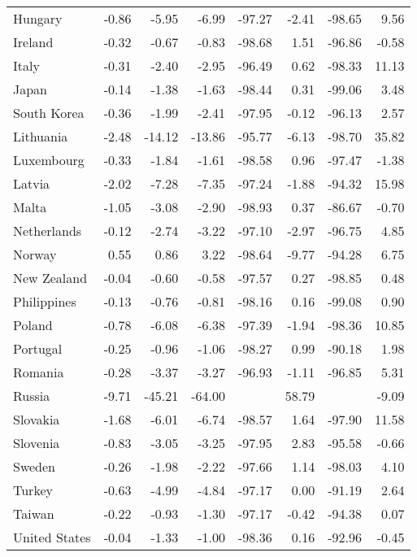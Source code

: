 \begin{longtable}{lrrrrrrr}
  Hungary & -0.86 & -5.95 & -6.99 & -97.27 & -2.41 & -98.65 & 9.56 \\ 
  Ireland & -0.32 & -0.67 & -0.83 & -98.68 & 1.51 & -96.86 & -0.58 \\ 
  Italy & -0.31 & -2.40 & -2.95 & -96.49 & 0.62 & -98.33 & 11.13 \\ 
  Japan & -0.14 & -1.38 & -1.63 & -98.44 & 0.31 & -99.06 & 3.48 \\ 
  South Korea & -0.36 & -1.99 & -2.41 & -97.95 & -0.12 & -96.13 & 2.57 \\ 
  Lithuania & -2.48 & -14.12 & -13.86 & -95.77 & -6.13 & -98.70 & 35.82 \\ 
  Luxembourg & -0.33 & -1.84 & -1.61 & -98.58 & 0.96 & -97.47 & -1.38 \\ 
  Latvia & -2.02 & -7.28 & -7.35 & -97.24 & -1.88 & -94.32 & 15.98 \\ 
  Malta & -1.05 & -3.08 & -2.90 & -98.93 & 0.37 & -86.67 & -0.70 \\ 
  Netherlands & -0.12 & -2.74 & -3.22 & -97.10 & -2.97 & -96.75 & 4.85 \\ 
  Norway & 0.55 & 0.86 & 3.22 & -98.64 & -9.77 & -94.28 & 6.75 \\ 
  New Zealand & -0.04 & -0.60 & -0.58 & -97.57 & 0.27 & -98.85 & 0.48 \\ 
  Philippines & -0.13 & -0.76 & -0.81 & -98.16 & 0.16 & -99.08 & 0.90 \\ 
  Poland & -0.78 & -6.08 & -6.38 & -97.39 & -1.94 & -98.36 & 10.85 \\ 
  Portugal & -0.25 & -0.96 & -1.06 & -98.27 & 0.99 & -90.18 & 1.98 \\ 
  Romania & -0.28 & -3.37 & -3.27 & -96.93 & -1.11 & -96.85 & 5.31 \\ 
  Russia & -9.71 & -45.21 & -64.00 &  & 58.79 &  & -9.09 \\ 
  Slovakia & -1.68 & -6.01 & -6.74 & -98.57 & 1.64 & -97.90 & 11.58 \\ 
  Slovenia & -0.83 & -3.05 & -3.25 & -97.95 & 2.83 & -95.58 & -0.66 \\ 
  Sweden & -0.26 & -1.98 & -2.22 & -97.66 & 1.14 & -98.03 & 4.10 \\ 
  Turkey & -0.63 & -4.99 & -4.84 & -97.17 & 0.00 & -91.19 & 2.64 \\ 
  Taiwan & -0.22 & -0.93 & -1.30 & -97.17 & -0.42 & -94.38 & 0.07 \\ 
  United States & -0.04 & -1.33 & -1.00 & -98.36 & 0.16 & -92.96 & -0.45 \\ 
   \hline
\hline
\end{longtable}

